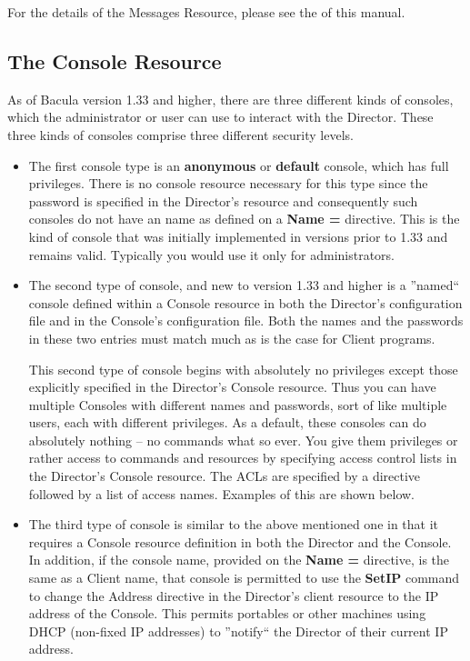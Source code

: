 For the details of the Messages Resource, please see the 
 of this
manual. 

\subsection*{The Console Resource}
\label{ConsoleResource1}

As of Bacula version 1.33 and higher, there are three different kinds of
consoles, which the administrator or user can use to interact with the
Director. These three kinds of consoles comprise three different security
levels. 

\begin{itemize}
\item The first console type is an {\bf anonymous} or {\bf default}  console,
   which  has full privileges. There is no console resource necessary  for this
   type since the password is specified in the Director's  resource and
consequently such consoles do not have an  name as defined on a {\bf Name =}
directive. This is the kind of  console that was initially implemented in
versions prior to 1.33  and remains valid. Typically you would use it only for
 administrators.  
\item The second type of console, and new to version 1.33 and  higher is a
   ''named`` console defined within  a Console resource in both the Director's
   configuration file and in  the Console's configuration file. Both the names
and the passwords  in these two entries must match much as is the case for 
Client programs.  

This second type of console begins with absolutely no  privileges except those
explicitly specified in the Director's  Console resource. Thus you can have
multiple Consoles with  different names and passwords, sort of like multiple
users, each  with different privileges. As a  default, these consoles can do
absolutely nothing -- no commands  what so ever. You give them privileges or
rather access  to commands and resources by specifying access  control lists
in the Director's Console resource. The ACLs are  specified by a directive
followed by a list of access names.  Examples of this are shown below.  
\item The third type of console is similar to the above mentioned  one in that
   it requires a Console resource definition in both  the Director and the
   Console. In addition, if the console name,  provided on the {\bf Name =}
directive, is the same as a Client  name, that console is permitted to use the
{\bf SetIP}  command to change the Address directive in the  Director's client
resource to the IP address of the Console. This  permits portables or other
machines using DHCP (non-fixed IP addresses)  to ''notify`` the Director of
their current IP address.  
\end{itemize}

